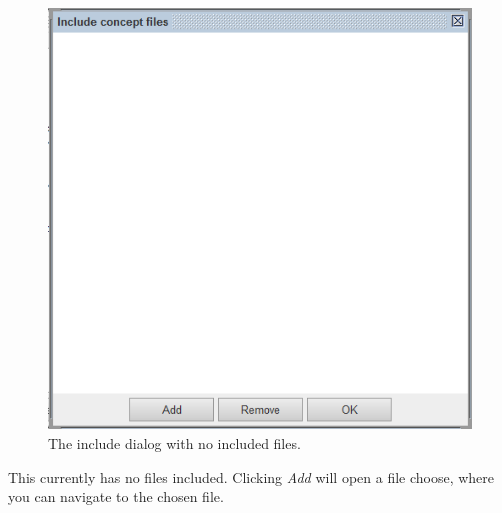 \documentclass[british,technote,compsoc]{IEEEtran}
\begin{document}
\begin{figure}[H]
\begin{centering}
\includegraphics[scale=0.5]{images/include_dialog.png}
\par\end{centering}

\begin{centering}
\protect\caption{\label{fig:include_dialog}The include dialog with no included files.}

\par\end{centering}

\end{figure}

\noindent This currently has no files included. Clicking \emph{Add} will open a file choose, where you can navigate to the chosen file. 
\end{document}

